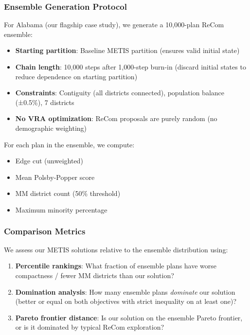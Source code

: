 \subsubsection{Ensemble Generation Protocol}

For Alabama (our flagship case study), we generate a 10,000-plan ReCom ensemble:

\begin{itemize}
    \item \textbf{Starting partition}: Baseline METIS partition (ensures valid initial state)
    \item \textbf{Chain length}: 10,000 steps after 1,000-step burn-in (discard initial states to reduce dependence on starting partition)
    \item \textbf{Constraints}: Contiguity (all districts connected), population balance (±0.5\%), 7 districts
    \item \textbf{No VRA optimization}: ReCom proposals are purely random (no demographic weighting)
\end{itemize}

For each plan in the ensemble, we compute:
\begin{itemize}
    \item Edge cut (unweighted)
    \item Mean Polsby-Popper score
    \item MM district count (50\% threshold)
    \item Maximum minority percentage
\end{itemize}

\subsubsection{Comparison Metrics}

We assess our METIS solutions relative to the ensemble distribution using:

\begin{enumerate}
    \item \textbf{Percentile rankings}: What fraction of ensemble plans have worse compactness / fewer MM districts than our solution?
    \item \textbf{Domination analysis}: How many ensemble plans \emph{dominate} our solution (better or equal on both objectives with strict inequality on at least one)?
    \item \textbf{Pareto frontier distance}: Is our solution on the ensemble Pareto frontier, or is it dominated by typical ReCom exploration?
\end{enumerate}

